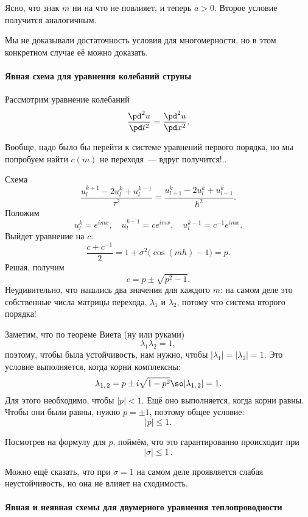 \documentclass{trlnotes}
\begin{document}
Ясно, что знак $m$ ни на что не повлияет, и теперь $a > 0$. Второе условие получится аналогичным.

\begin{rem}
	Мы не доказывали достаточность условия для многомерности, но в этом конкретном случае её можно доказать.
\end{rem}

\paragraph{Явная схема для уравнения колебаний струны}

Рассмотрим уравнение колебаний
\[
	\dfrac{\pd^2 u}{\pd t^2} = \dfrac{\pd^2 u}{\pd x^2}.
\]

Вообще, надо было бы перейти к системе уравнений первого порядка, но мы попробуем найти $c(m)$ не переходя~--- вдруг получится!..

Схема
\[
	\dfrac{u_l^{k + 1} - 2u_l^k + u_l^{k-1}}{\tau^2} = \dfrac{u^k_{l+1} - 2u^k_l + u^k_{l-1}}{h^2}.
\]
Положим
\[
	u_l^k = e^{imx}, \quad u_l^{k+1} = ce^{imx}, \quad u_l^{k-1} = c^{-1} e^{imx}.
\]
Выйдет уравнение на $c$:
\[
	\dfrac{c + c^{-1}}{2} = 1 + \sigma^2\big(\cos(mh) - 1\big) = p.
\]
Решая, получим
\[
	c = p \pm \sqrt{p^2 - 1}.
\]
Неудивительно, что нашлись два значения для каждого $m$: на самом деле это собственные числа матрицы перехода, $\lambda_1$ и $\lambda_2$, потому что система второго порядка!

Заметим, что по теореме Виета (ну или руками) 
\[
	\lambda_1 \lambda_2 = 1,
\]
поэтому, чтобы была устойчивость, нам нужно, чтобы $|\lambda_1| = |\lambda_2| = 1$. Это условие выполняется, когда корни комплексны:
\[
	\lambda_{1, \, 2} = p \pm i\sqrt{1 - p^2} \so |\lambda_{1, \, 2}| = 1.
\]
Для этого необходимо, чтобы $|p| < 1$. Ещё оно выполняется, когда корни равны. Чтобы они были равны, нужно $p = \pm 1$, поэтому общее условие:
\[
	|p| \leqslant 1.
\]

Посмотрев на формулу для $p$, поймём, что это гарантированно происходит при 
\[
	\boxed{|\sigma| \leqslant 1}\,.
\]

\begin{rem}
	Можно ещё сказать, что при $\sigma = 1$ на самом деле проявляется слабая неустойчивость, но она не влияет на сходимость.
\end{rem}

\paragraph{Явная и неявная схемы для двумерного уравнения теплопроводности}
\end{document}
